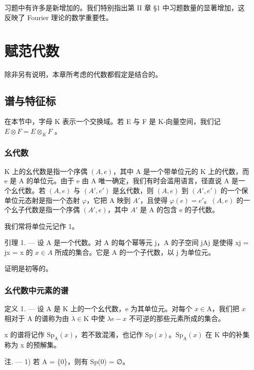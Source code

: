 习题中有许多是新增加的。我们特别指出第 II 章 §1 中习题数量的显著增加，这反映了 Fourier 理论的数学重要性。

\chapter{赋范代数}

除非另有说明，本章所考虑的代数都假定是结合的。

\section{谱与特征标}

在本节中，字母 K 表示一个交换域。若 E 与 F 是 K-向量空间，我们记 \(E \otimes F = E \otimes_{K} F\) 。

\subsection{幺代数}

K 上的幺代数是指一个序偶 \((A,e)\)，其中 A 是一个带单位元的 K 上的代数，而 e 是 A 的单位元。由于 e 由 A 唯一确定，我们有时会滥用语言，径直说 A 是一个幺代数。若 \((A,e)\) 与 \((A',e')\) 是幺代数，则 \((A,e)\) 到 \((A',e')\) 的一个保单位元态射是指一个态射 \(\varphi\)，它把 A 映到 \(A'\)，且使得 \(\varphi(e)=e'\)。\((A,e)\) 的一个幺子代数是指一个序偶 \((A',e)\)，其中 \(A'\) 是 A 的包含 e 的子代数。

我们常将单位元记作 1。

引理 1. --- 设 A 是一个代数。对 A 的每个幂等元 j，A 的子空间 jAj 是使得 xj = jx = x 的 \(x \in A\) 所成的集合。它是 A 的一个子代数，以 j 为单位元。

证明是初等的。

\subsection{幺代数中元素的谱}

定义 1. --- 设 A 是 K 上的一个幺代数，e 为其单位元。对每个 \(x \in \mathrm{A}\)，我们把 \(x\) 相对于 A 的谱称为由 \(\lambda \in \mathrm{K}\) 中使 \(\lambda e - x\) 不可逆的那些元素所成的集合。

x 的谱将记作 \(\mathrm{Sp}_{\mathrm{A}}(x)\)，若不致混淆，也记作 \(\mathrm{Sp}(x)\)。\(\mathrm{Sp}_{\mathrm{A}}(x)\) 在 K 中的补集称为 x 的预解集。

注. --- 1) 若 A = \{0\}，则有 Sp(0) = ∅。

